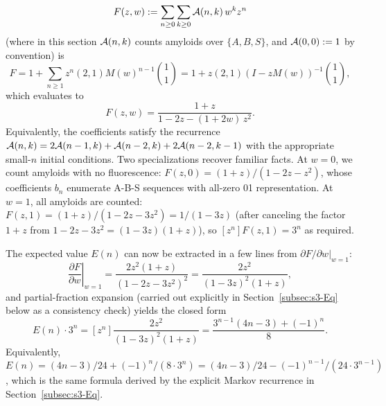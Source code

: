 \documentclass[11pt]{article}
\newcommand{\cA}{ {\cal A} }
\begin{document}
\[
F(z, w) := \sum_{n \ge 0} \sum_{k \ge 0} \cA(n, k)\, w^k z^n
\]
(where in this section $\cA(n,k)$ counts amyloids over $\{A,B,S\}$, and $\cA(0, 0) := 1$ by convention) is
\[
F = 1 + \sum_{n \ge 1} z^n (2,1)M(w)^{n-1}\binom{1}{1}
=1 + z(2, 1) (I - z M(w))^{-1} \binom{1}{1},
\]
which evaluates to
\begin{equation}\label{eq:s3-bivar-gf}
F(z, w) = \frac{1 + z}{1 - 2z - (1 + 2w)\,z^2}.
\end{equation}
Equivalently, the coefficients satisfy the recurrence $\cA(n, k) = 2\cA(n-1, k) + \cA(n-2, k) + 2\cA(n-2, k-1)$ with the appropriate small-$n$ initial conditions. Two specializations recover familiar facts. At $w = 0$, we count amyloids with no fluorescence: $F(z, 0) = (1+z)/(1 - 2z - z^2)$, whose coefficients $b_n$ enumerate A-B-S sequences with all-zero 01 representation. At $w = 1$, all amyloids are counted: $F(z, 1) = (1+z)/(1 - 2z - 3z^2) = 1/(1 - 3z)$ (after canceling the factor $1+z$ from $1 - 2z - 3z^2 = (1 - 3z)(1 + z)$), so $[z^n] F(z, 1) = 3^n$ as required.

The expected value $E(n)$ can now be extracted in a few lines from $\partial F / \partial w \big|_{w=1}$:
\[
\left.\frac{\partial F}{\partial w}\right|_{w = 1} = \frac{2 z^2 (1+z)}{(1 - 2z - 3z^2)^2} = \frac{2 z^2}{(1 - 3z)^2 (1 + z)},
\]
and partial-fraction expansion (carried out explicitly in Section~\ref{subsec:s3-Eq} below as a consistency check) yields the closed form
\[
E(n) \cdot 3^n = [z^n] \frac{2 z^2}{(1 - 3z)^2 (1 + z)} = \frac{3^{n-1}(4n - 3) + (-1)^n}{8}.
\]
Equivalently, $E(n) = (4n - 3)/24 + (-1)^n / (8 \cdot 3^n) = (4n-3)/24 - (-1)^{n-1}/(24 \cdot 3^{n-1})$, which is the same formula derived by the explicit Markov recurrence in Section~\ref{subsec:s3-Eq}.
\end{document}
